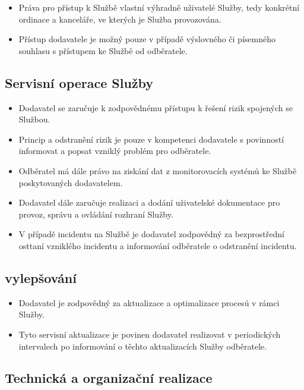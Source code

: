 \documentclass[11pt, a4paper, titlepage]{article}
\begin{document}
	\begin{itemize}
		\item Práva pro přístup k Službě vlastní výhradně uživatelé Služby, tedy konkrétní ordinace a kanceláře, ve kterých je Služba provozována.
		\item Přístup dodavatele je možný pouze v případě výslovného či písemného souhlasu s přístupem ke Službě od odběratele.
	\end{itemize}

	\subsection*{Servisní operace Služby}

	\begin{itemize}
		\item Dodavatel se zaručuje k zodpovědnému přístupu k řešení rizik spojených se Službou.
		\item Princip a odstranění rizik je pouze v kompetenci dodavatele s povinností informovat a popsat vzniklý problém pro odběratele.
		\item Odběratel má dále právo na ziskání dat z monitorovacích systémů ke Službě poskytovaných dodavatelem.
		\item Dodavatel dále zaručuje realizaci a dodání uživatelské dokumentace pro provoz, správu a ovládání rozhraní Služby.
		\item V případě incidentu na Službě je dodavatel zodpovědný za bezprostřední osttaní vzniklého incidentu a informování odběratele o odstranění incidentu.
	\end{itemize}

	\subsection*{vylepšování}

	\begin{itemize}
		\item Dodavatel je zodpovědný za aktualizace a optimalizace procesů v rámci Služby.
		\item Tyto servisní aktualizace je povinen dodavatel realizovat v periodických intervalech po informování o těchto aktualizacích Služby odběratele.  
	\end{itemize}

	\subsection*{Technická a organizační realizace}
\end{document}
